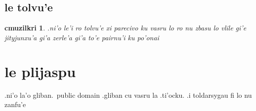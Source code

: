 \documentclass{report}
\newtheorem{cmuzilkri}{cmuzilkri}
\begin{document}
\section{le tolvu'e}
\begin{cmuzilkri}
	.ni'o le'i ro tolvu'e xi parecivo ku vasru lo ro nu zbasu lo vlile gi'e jityjunxu'a gi'a zerle'a gi'a to'e pairnu'i ku po'onai
\end{cmuzilkri}

\chapter{le plijaspu}
.ni'o la'o gliban.\ public domain .gliban cu vasru la .ti'ocku.  .i toldarsygau fi lo nu zanfu'e
\end{document}
